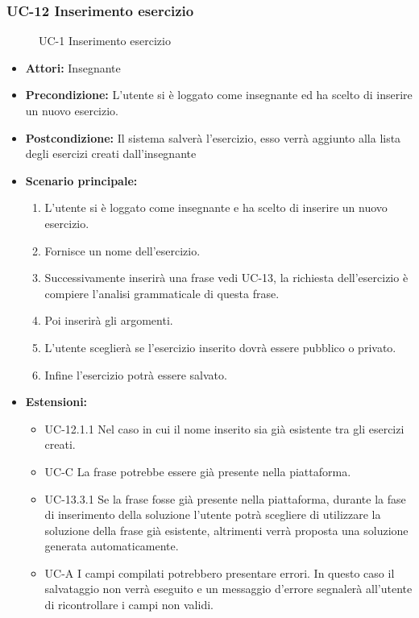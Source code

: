 \subsubsection{UC-12 Inserimento esercizio}
\begin{figure}[htbp]
	\centering
	\caption{UC-1 Inserimento esercizio}
\end{figure}
	\begin{itemize}
		\item \textbf{Attori: }Insegnante
		\item \textbf{Precondizione: }L'utente si è loggato come insegnante ed ha scelto di inserire un nuovo esercizio.
		\item \textbf{Postcondizione: }Il sistema salverà l'esercizio, esso verrà aggiunto alla lista degli esercizi creati dall'insegnante
		\item \textbf{Scenario principale: }
		\begin{enumerate}
		\item L'utente si è loggato come insegnante e ha scelto di inserire un nuovo esercizio. 
		\item Fornisce un nome dell'esercizio. 
		\item Successivamente inserirà una frase vedi UC-13, la richiesta dell'esercizio è compiere l'analisi grammaticale di questa frase. 
		
		\item Poi inserirà gli argomenti. 
		\item L'utente sceglierà se l'esercizio inserito dovrà essere pubblico o privato.
		\item Infine l'esercizio potrà essere salvato.
		\end{enumerate}
		
		\item \textbf{Estensioni: }
		\begin{itemize}
		\item UC-12.1.1 Nel caso in cui il nome inserito sia già esistente tra gli esercizi creati.
		\item UC-C La frase potrebbe essere già presente nella piattaforma.
		\item UC-13.3.1 Se la frase fosse già presente nella piattaforma, durante la fase di inserimento della soluzione l'utente potrà scegliere di utilizzare la soluzione della frase già esistente, altrimenti verrà proposta una soluzione generata automaticamente.
		\item UC-A I campi compilati potrebbero presentare errori. In questo caso il salvataggio non verrà eseguito e un messaggio d'errore segnalerà all'utente di ricontrollare i campi non validi.
		\end{itemize}
	\end{itemize}

